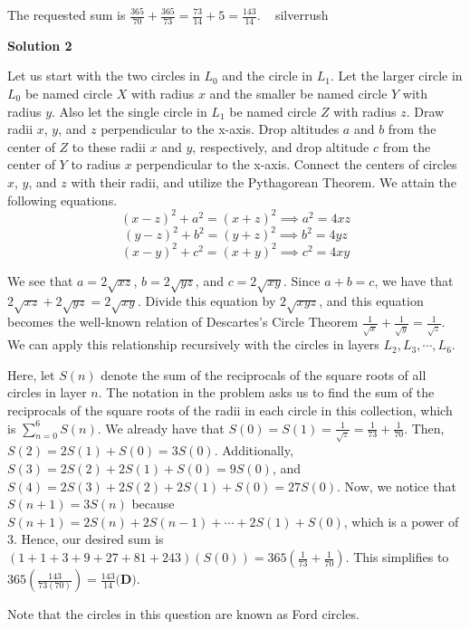 \begin{enumerate}
 The requested sum is $\frac{365}{70}+\frac{365}{73}=\frac{73}{14}+5=\boxed{\frac{143}{14}}.$ ~ silverrush

 



\textbf{Solution 2}

Let us start with the two circles in $L_0$ and the circle in $L_1$. Let the larger circle in $L_0$ be named circle $X$ with radius $x$ and the smaller be named circle $Y$ with radius $y$. Also let the single circle in $L_1$ be named circle $Z$ with radius $z$. Draw radii $x$, $y$, and $z$ perpendicular to the x-axis. Drop altitudes $a$ and $b$ from the center of $Z$ to these radii $x$ and $y$, respectively, and drop altitude $c$ from the center of $Y$ to radius $x$ perpendicular to the x-axis. Connect the centers of circles $x$, $y$, and $z$ with their radii, and utilize the Pythagorean Theorem. We attain the following equations. 
 \[(x - z)^2 + a^2 = (x + z)^2 \implies a^2 = 4xz\] 
 \[(y - z)^2 + b^2 = (y + z)^2 \implies b^2 = 4yz\] 
 \[(x - y)^2 + c^2 = (x + y)^2 \implies c^2 = 4xy\]

 We see that $a = 2\sqrt{xz}$, $b = 2\sqrt{yz}$, and $c = 2\sqrt{xy}$. Since $a + b = c$, we have that $2\sqrt{xz} + 2\sqrt{yz} = 2\sqrt{xy}$. Divide this equation by $2\sqrt{xyz}$, and this equation becomes the well-known relation of Descartes's Circle Theorem $\frac{1}{\sqrt{x}} + \frac{1}{\sqrt{y}} = \frac{1}{\sqrt{z}}.$ We can apply this relationship recursively with the circles in layers $L_2, L_3, \cdots, L_6$.

 Here, let $S(n)$ denote the sum of the reciprocals of the square roots of all circles in layer $n$. The notation in the problem asks us to find the sum of the reciprocals of the square roots of the radii in each circle in this collection, which is $\textstyle\sum_{n=0}^{6}S(n)$.  We already have that $S(0) = S(1) = \frac{1}{\sqrt{z}} = \frac{1}{73} +  \frac{1}{70}$. Then, $S(2) = 2S(1) + S(0) = 3S(0)$. Additionally, $S(3) = 2S(2) + 2S(1) + S(0) = 9S(0)$, and $S(4) = 2S(3) + 2S(2) + 2S(1) + S(0) = 27S(0)$. Now, we notice that $S(n + 1) = 3S(n)$ because $S(n + 1) = 2S(n) + 2S(n - 1) + \cdots + 2S(1) + S(0)$, which is a power of $3.$ Hence, our desired sum is $(1 + 1 + 3 + 9 + 27 + 81 + 243)(S(0)) = 365\left(\frac{1}{73} +  \frac{1}{70}\right)$. This simplifies to $365\left(\frac{143}{73(70)}\right) = \frac{143}{14} \textbf{(D)}$.

 Note that the circles in this question are known as Ford circles.

 




\end{enumerate}
